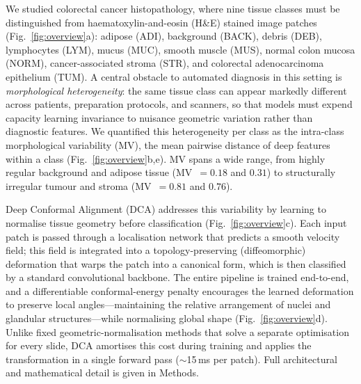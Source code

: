 \documentclass[pdflatex,sn-nature]{sn-jnl}%
\theoremstyle{thmstyleone}%
\theoremstyle{thmstyletwo}%
\theoremstyle{thmstylethree}%
\begin{document}
We studied colorectal cancer histopathology, where nine tissue classes must be
distinguished from haematoxylin-and-eosin (H\&E) stained image patches
(Fig.~\ref{fig:overview}a): adipose (ADI), background (BACK), debris (DEB),
lymphocytes (LYM), mucus (MUC), smooth muscle (MUS), normal colon mucosa
(NORM), cancer-associated stroma (STR), and colorectal adenocarcinoma
epithelium (TUM). A central obstacle to automated diagnosis in this setting is
\textit{morphological heterogeneity}: the same tissue class can appear markedly
different across patients, preparation protocols, and scanners, so that models
must expend capacity learning invariance to nuisance geometric variation rather
than diagnostic features. We quantified this heterogeneity per class as the
intra-class morphological variability (MV), the mean pairwise distance of
deep features within a class (Fig.~\ref{fig:overview}b,e). MV spans a wide range,
from highly regular background and adipose tissue (MV~$=0.18$ and $0.31$) to
structurally irregular tumour and stroma (MV~$=0.81$ and $0.76$).

Deep Conformal Alignment (DCA) addresses this variability by learning to
normalise tissue geometry before classification (Fig.~\ref{fig:overview}c).
Each input patch is passed through a localisation network that predicts a
smooth velocity field; this field is integrated into a topology-preserving
(diffeomorphic) deformation that warps the patch into a canonical form, which is
then classified by a standard convolutional backbone. The entire pipeline is
trained end-to-end, and a differentiable conformal-energy penalty encourages the
learned deformation to preserve local angles---maintaining the relative
arrangement of nuclei and glandular structures---while normalising global shape
(Fig.~\ref{fig:overview}d). Unlike fixed geometric-normalisation methods that
solve a separate optimisation for every slide, DCA amortises this cost during
training and applies the transformation in a single forward pass
($\sim$15\,ms per patch). Full architectural and mathematical detail is given in
Methods.
\end{document}
